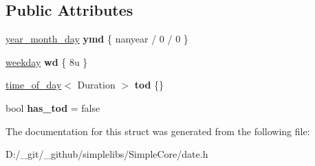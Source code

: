 \subsection*{Public Attributes}
\begin{DoxyCompactItemize}
\item 
\mbox{\label{structdate_1_1fields_a7ad38573327cf02a071d32ac089e51de}} 
\mbox{\hyperlink{classdate_1_1year__month__day}{year\+\_\+month\+\_\+day}} {\bfseries ymd} \{ nanyear / 0 / 0 \}
\item 
\mbox{\label{structdate_1_1fields_a8dca608f10995a52fed6cd91db54ae03}} 
\mbox{\hyperlink{classdate_1_1weekday}{weekday}} {\bfseries wd} \{ 8u \}
\item 
\mbox{\label{structdate_1_1fields_a4ca9ed8a1e5109031e5cda16c70ee08c}} 
\mbox{\hyperlink{classdate_1_1time__of__day}{time\+\_\+of\+\_\+day}}$<$ Duration $>$ {\bfseries tod} \{\}
\item 
\mbox{\label{structdate_1_1fields_ac9c72d59e176e72c9ea5c225efd8ab23}} 
bool {\bfseries has\+\_\+tod} = false
\end{DoxyCompactItemize}


The documentation for this struct was generated from the following file\+:\begin{DoxyCompactItemize}
\item 
D\+:/\+\_\+git/\+\_\+github/simplelibs/\+Simple\+Core/date.\+h\end{DoxyCompactItemize}
